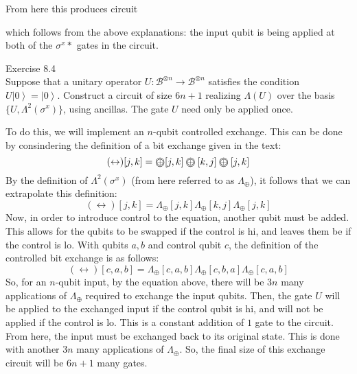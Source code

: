 \documentclass{exam} %
\newcommand{\cl}[1]{\mathcal{#1}}  %
\theoremstyle{plain}
\theoremstyle{definition}
\theoremstyle{remark}
\numberwithin{equation}{section}  %
\newcommand{\kvect}[1]{ \left| #1 \right> }
\newcommand\ooplus{\stackMath\mathbin{\stackinset{c}{0ex}{c}{0ex}{\oplus}{\bigcirc}}}
\begin{document}
\begin{questions}
\begin{solution}
    From here this produces circuit\\
    \begin{center}
    \end{center}
    which follows from the above explanations: the input qubit is being applied at
    both of the $\sigma^x*$ gates in the circuit.
  \end{solution}
  \question Exercise 8.4\\
  Suppose that a unitary operator $U: \cl{B}^{\otimes{n}}\rightarrow\cl{B}^
  {\otimes{n}}$ satisfies the condition $U\kvect{0} = \kvect{0}$. Construct a 
  circuit of size $6n+1$ realizing $\Lambda(U)$ over the basis $\{U, 
  \Lambda^2(\sigma^x)\}$, using ancillas. The gate $U$ need only be applied 
  once.\\ 
  \begin{solution}
    To do this, we will implement an $n$-qubit controlled exchange. This can
    be done by consindering the definition of a bit exchange given in the text:
    \[
      (\leftrightarrow)[j,k] = \ooplus[j,k]\ooplus[k,j]\ooplus[j,k]
    \]
    By the definition of $\Lambda^2(\sigma^x)$ (from here referred to as 
    $\Lambda_\oplus$), it follows that we can extrapolate this definition:
    \[
      (\leftrightarrow)[j,k] = \Lambda_\oplus[j,k]\Lambda_\oplus[k,j]\Lambda_\oplus[j,k]
    \]
    Now, in order to introduce control to the equation, another qubit must be
    added. This allows for the qubits to be swapped if the control is hi, and
    leaves them be if the control is lo. With qubits $a,b$ and control qubit $c$,
    the definition of the controlled bit exchange is as follows:
    \[
      (\leftrightarrow)[c, a, b] = \Lambda_\oplus[c, a, b]\Lambda_\oplus[c,b, a]
      \Lambda_\oplus[c, a, b]
    \]
    So, for an $n$-qubit input, by the equation above, there will be $3n$ many
    applications of $\Lambda_\oplus$ required to exchange the input qubits. Then,
    the gate $U$ will be applied to the exchanged input if the control qubit is hi,
    and will not be applied if the control is lo. This is a constant addition of 
    $1$ gate to the circuit. From here, the input must be exchanged back to its
    original state. This is done with another $3n$ many applications of 
    $\Lambda_\oplus$. So, the final size of this exchange circuit will be $6n+1$
    many gates. 
  \end{solution}
\end{questions}
\end{document}
